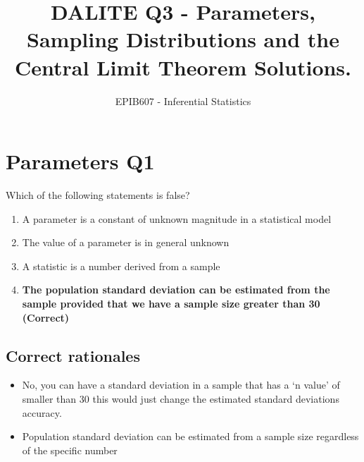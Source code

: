 \documentclass[letterpaper,12pt,twoside,printwatermark=false]{pinp}
\title{DALITE Q3 - Parameters, Sampling Distributions and the Central Limit
Theorem Solutions.}
\author[a]{EPIB607 - Inferential Statistics}
\affil[a]{Fall 2019, McGill University}
\providecommand{\tightlist}{%
  \setlength{\itemsep}{0pt}\setlength{\parskip}{0pt}}
\begin{document}
\verticaladjustment{-2pt}

\maketitle
\thispagestyle{firststyle}



\hypertarget{parameters-q1}{%
\section{Parameters Q1}\label{parameters-q1}}

Which of the following statements is false?

\begin{enumerate}
\def\labelenumi{\alph{enumi})}
\tightlist
\item
  A parameter is a constant of unknown magnitude in a statistical model
\item
  The value of a parameter is in general unknown
\item
  A statistic is a number derived from a sample
\item
  \textbf{The population standard deviation can be estimated from the
  sample provided that we have a sample size greater than 30 (Correct)}
\end{enumerate}

\hypertarget{correct-rationales}{%
\subsection{Correct rationales}\label{correct-rationales}}

\begin{itemize}
\tightlist
\item
  No, you can have a standard deviation in a sample that has a `n value'
  of smaller than 30 this would just change the estimated standard
  deviations accuracy.
\item
  Population standard deviation can be estimated from a sample size
  regardless of the specific number
\end{itemize}
\end{document}
